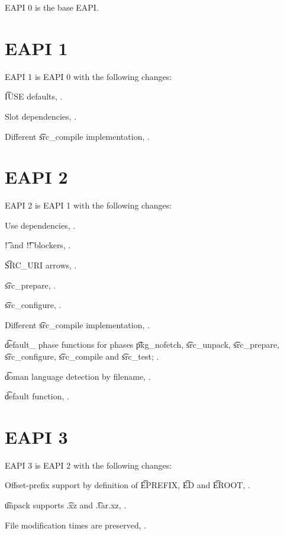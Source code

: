 EAPI 0 is the base EAPI.

\section*{EAPI 1}

EAPI 1 is EAPI 0 with the following changes:

\begin{compactitem}
\item \t{IUSE} defaults, .
\item Slot dependencies, .
\item Different \t{src\_compile} implementation, .
\end{compactitem}

\section*{EAPI 2}

EAPI 2 is EAPI 1 with the following changes:

\begin{compactitem}
\item Use dependencies, .
\item \t{!} and \t{!!} blockers, .
\item \t{SRC\_URI} arrows, .
\item \t{src\_prepare}, .
\item \t{src\_configure}, .
\item Different \t{src\_compile} implementation, .
\item \t{default\_} phase functions for phases \t{pkg\_nofetch}, \t{src\_unpack}, \t{src\_prepare},
    \t{src\_configure}, \t{src\_compile} and \t{src\_test}; .
\item \t{doman} language detection by filename, .
\item \t{default} function, .
\end{compactitem}

\section*{EAPI 3}

EAPI 3 is EAPI 2 with the following changes:
\begin{compactitem}
\item Offset-prefix support by definition of \t{EPREFIX}, \t{ED} and \t{EROOT},
    .
\item \t{unpack} supports \t{.xz} and \t{.tar.xz}, .
\item File modification times are preserved, .
\end{compactitem}


